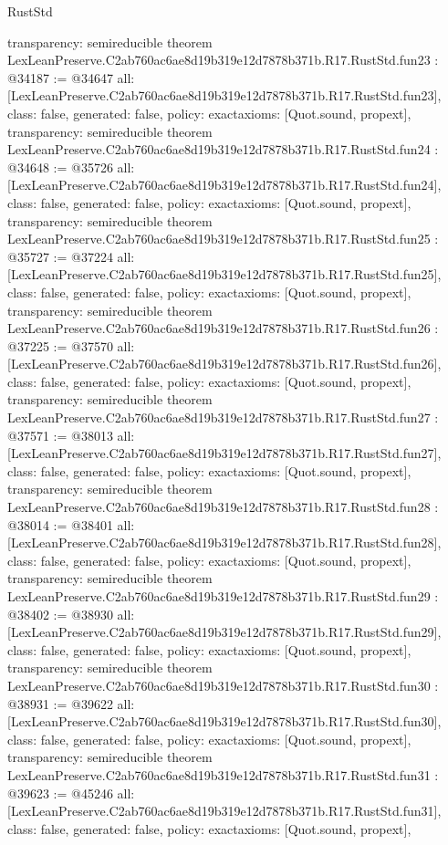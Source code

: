 \begin{lexlean}{RustStd}
\begin{coremodule}
{  transparency: semireducible
}
theorem LexLeanPreserve.C2ab760ac6ae8d19b319e12d7878b371b.R17.RustStd.fun23 : @34187 := @34647 {
  all: [LexLeanPreserve.C2ab760ac6ae8d19b319e12d7878b371b.R17.RustStd.fun23],
  class: false,
  generated: false,
  policy: exact{axioms: [Quot.sound, propext]},
  transparency: semireducible
}
theorem LexLeanPreserve.C2ab760ac6ae8d19b319e12d7878b371b.R17.RustStd.fun24 : @34648 := @35726 {
  all: [LexLeanPreserve.C2ab760ac6ae8d19b319e12d7878b371b.R17.RustStd.fun24],
  class: false,
  generated: false,
  policy: exact{axioms: [Quot.sound, propext]},
  transparency: semireducible
}
theorem LexLeanPreserve.C2ab760ac6ae8d19b319e12d7878b371b.R17.RustStd.fun25 : @35727 := @37224 {
  all: [LexLeanPreserve.C2ab760ac6ae8d19b319e12d7878b371b.R17.RustStd.fun25],
  class: false,
  generated: false,
  policy: exact{axioms: [Quot.sound, propext]},
  transparency: semireducible
}
theorem LexLeanPreserve.C2ab760ac6ae8d19b319e12d7878b371b.R17.RustStd.fun26 : @37225 := @37570 {
  all: [LexLeanPreserve.C2ab760ac6ae8d19b319e12d7878b371b.R17.RustStd.fun26],
  class: false,
  generated: false,
  policy: exact{axioms: [Quot.sound, propext]},
  transparency: semireducible
}
theorem LexLeanPreserve.C2ab760ac6ae8d19b319e12d7878b371b.R17.RustStd.fun27 : @37571 := @38013 {
  all: [LexLeanPreserve.C2ab760ac6ae8d19b319e12d7878b371b.R17.RustStd.fun27],
  class: false,
  generated: false,
  policy: exact{axioms: [Quot.sound, propext]},
  transparency: semireducible
}
theorem LexLeanPreserve.C2ab760ac6ae8d19b319e12d7878b371b.R17.RustStd.fun28 : @38014 := @38401 {
  all: [LexLeanPreserve.C2ab760ac6ae8d19b319e12d7878b371b.R17.RustStd.fun28],
  class: false,
  generated: false,
  policy: exact{axioms: [Quot.sound, propext]},
  transparency: semireducible
}
theorem LexLeanPreserve.C2ab760ac6ae8d19b319e12d7878b371b.R17.RustStd.fun29 : @38402 := @38930 {
  all: [LexLeanPreserve.C2ab760ac6ae8d19b319e12d7878b371b.R17.RustStd.fun29],
  class: false,
  generated: false,
  policy: exact{axioms: [Quot.sound, propext]},
  transparency: semireducible
}
theorem LexLeanPreserve.C2ab760ac6ae8d19b319e12d7878b371b.R17.RustStd.fun30 : @38931 := @39622 {
  all: [LexLeanPreserve.C2ab760ac6ae8d19b319e12d7878b371b.R17.RustStd.fun30],
  class: false,
  generated: false,
  policy: exact{axioms: [Quot.sound, propext]},
  transparency: semireducible
}
theorem LexLeanPreserve.C2ab760ac6ae8d19b319e12d7878b371b.R17.RustStd.fun31 : @39623 := @45246 {
  all: [LexLeanPreserve.C2ab760ac6ae8d19b319e12d7878b371b.R17.RustStd.fun31],
  class: false,
  generated: false,
  policy: exact{axioms: [Quot.sound, propext]},
}
\end{coremodule}
\end{lexlean}
